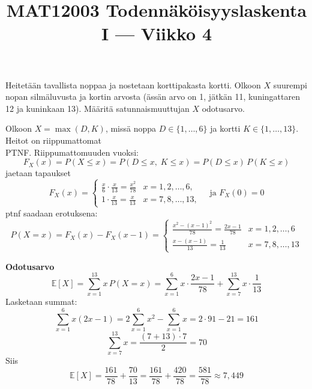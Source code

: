 \documentclass[12pt,a4paper]{article}
\title{MAT12003 Todennäköisyyslaskenta I — Viikko 4}
\date{}
\begin{document}
\maketitle

Heitetään tavallista noppaa ja nostetaan korttipakasta kortti. Olkoon $X$ suurempi nopan silmäluvusta ja kortin arvosta (ässän arvo on 1, jätkän 11, kuningattaren 12 ja kuninkaan 13). Määritä satunnaismuuttujan $X$ odotusarvo.

\vspace{0.4cm}
Olkoon $X=\max(D,K)$, missä
noppa $D\in\{1,\dots,6\}$ ja kortti $K\in\{1,\dots,13\}$.
Heitot on riippumattomat\\


PTNF. Riippumattomuuden vuoksi:
\[
F_X(x)=P(X\le x)=P(D\le x,\;K\le x)=P(D\le x)\,P(K\le x)
\]
jaetaan tapaukset
\[
F_X(x)=
\begin{cases}
\displaystyle \frac{x}{6}\cdot\frac{x}{13}=\frac{x^2}{78} & x=1,2,\dots,6,\\[6pt]
\displaystyle 1\cdot\frac{x}{13}=\frac{x}{13} & x=7,8,\dots,13,
\end{cases}
\quad\text{ja }F_X(0)=0
\]
ptnf saadaan erotuksena:
\[
P(X=x)=F_X(x)-F_X(x-1)=
\begin{cases}
\displaystyle \frac{x^2-(x-1)^2}{78}=\frac{2x-1}{78} & x=1,2,\dots,6\\[8pt]
\displaystyle \frac{x-(x-1)}{13}=\frac{1}{13} & x=7,8,\dots,13
\end{cases}
\]

\textbf{Odotusarvo} 
\[
\mathbb{E}[X]=\sum_{x=1}^{13} x\,P(X=x)
=\sum_{x=1}^{6} x\cdot\frac{2x-1}{78}+\sum_{x=7}^{13} x\cdot\frac{1}{13}
\]
Lasketaan summat:
\[
\sum_{x=1}^{6} x(2x-1)=2\sum_{x=1}^{6}x^2-\sum_{x=1}^{6}x
=2\cdot 91-21=161
\]
\[
\sum_{x=7}^{13} x = \frac{(7+13)\cdot 7}{2}=70
\]
Siis
\[
\mathbb{E}[X]=\frac{161}{78}+\frac{70}{13}
=\frac{161}{78}+\frac{420}{78}
=\frac{581}{78}\approx 7{,}449
\]

\end{document}
